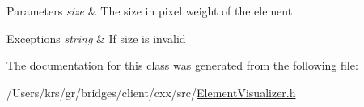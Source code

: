 \begin{DoxyParams}{Parameters}
{\em size} & The size in pixel weight of the element \\
\hline
\end{DoxyParams}

\begin{DoxyExceptions}{Exceptions}
{\em string} & If size is invalid \\
\hline
\end{DoxyExceptions}


The documentation for this class was generated from the following file\+:\begin{DoxyCompactItemize}
\item 
/\+Users/krs/gr/bridges/client/cxx/src/\hyperlink{_element_visualizer_8h}{Element\+Visualizer.\+h}\end{DoxyCompactItemize}
